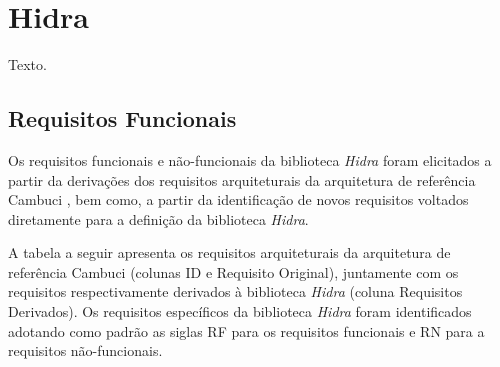 \chapter{Hidra} \label{chapter:hidra}

Texto.

\section{Requisitos Funcionais} \label{section:sec1}

Os requisitos funcionais e não-funcionais da biblioteca \textit{Hidra} foram elicitados a partir da derivações dos requisitos arquiteturais da arquitetura de referência Cambuci \cite{dissertacaoOsshiro2014}, bem como, a partir da identificação de novos requisitos voltados diretamente para a definição da biblioteca \textit{Hidra}.

A tabela a seguir apresenta os requisitos arquiteturais da arquitetura de referência Cambuci (colunas ID e Requisito Original), juntamente com os requisitos respectivamente derivados à biblioteca \textit{Hidra} (coluna Requisitos Derivados). Os requisitos específicos da biblioteca \textit{Hidra} foram identificados adotando como padrão as siglas RF para os requisitos funcionais e RN para a requisitos não-funcionais.

\newpage





